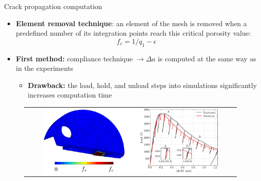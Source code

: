\documentclass[9pt]{beamer}
\begin{document}

\begin{frame}{Crack propagation computation}

\begin{itemize}
	\item \textbf{Element removal technique}: an element of the mesh is removed when a predefined number of its integration points reach this critical porosity value:
	\vspace{0.15cm}
	$$ f_c = 1/q_1 - \epsilon$$	
	\vspace{0.05cm}
	\item \textbf{First method:} compliance technique $\rightarrow \Delta a$ is computed at the same way as in the experiments
	\vspace{0.15cm}
	\begin{itemize}
	\item \textbf{Drawback:} the load, hold, and unload steps into simulations significantly increases computation time
	\end{itemize}
\end{itemize}

\vspace{0.15cm}

\begin{figure}
        \begin{tabular}{c}
            \includegraphics[width=0.85\textwidth]{Images/plot_Load_CMOD_Tfake_edt.pdf} \\
        \end{tabular}
    \end{figure}

\end{frame}

\end{document}
